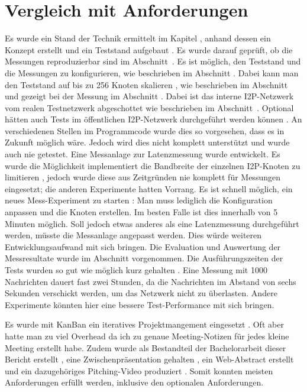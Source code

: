\section{Vergleich mit Anforderungen}\label{sec:vergleich_anforderungen}

Es wurde ein Stand der Technik ermittelt  im Kapitel , anhand dessen ein Konzept  erstellt und ein Teststand aufgebaut .
Es wurde darauf geprüft, ob die Messungen reproduzierbar sind  im Abschnitt~.
Es ist möglich, den Teststand und die Messungen zu konfigurieren, wie beschrieben im Abschnitt  .
Dabei kann man den Teststand auf bis zu 256 Knoten skalieren ,
wie beschrieben im Abschnitt  und gezeigt bei der Messung im Abschnitt .
Dabei ist das interne I2P-Netzwerk vom realen Testnetzwerk abgeschottet  wie beschrieben im Abschnitt~.
Optional hätten auch Tests im öffentlichen I2P-Netzwerk durchgeführt werden können .
An verschiedenen Stellen im Programmcode wurde dies so vorgesehen, dass es in Zukunft möglich wäre.
Jedoch wird dies nicht komplett unterstützt und wurde auch nie getestet.
Eine Messanlage zur Latenzmessung  wurde entwickelt.
Es wurde die Möglichkeit implementiert die Bandbreite der einzelnen I2P-Knoten zu limitieren , jedoch wurde diese aus Zeitgründen nie komplett für Messungen eingesetzt; die anderen Experimente hatten Vorrang.
Es ist schnell möglich, ein neues Mess-Experiment zu starten : Man muss lediglich die Konfiguration anpassen und die Knoten erstellen.
Im besten Falle ist dies innerhalb von 5 Minuten möglich.
Soll jedoch etwas anderes als eine Latenzmessung durchgeführt werden, müsste die Messanlage angepasst werden.
Dies würde weiteren Entwicklungsaufwand mit sich bringen.
Die Evaluation und Auswertung der Messresultate  wurde im Abschnitt  vorgenommen.
Die Ausführungszeiten der Tests wurden so gut wie möglich kurz gehalten . Eine Messung mit 1000 Nachrichten dauert fast zwei Stunden, da die Nachrichten im Abstand von sechs Sekunden verschickt werden, um das Netzwerk nicht zu überlasten. Andere Experimente könnten hier eine bessere Test-Performance mit sich bringen.

Es wurde mit KanBan ein iteratives Projektmangement eingesetzt .
Oft aber hatte man zu viel Overhead da ich zu genaue Meeting-Notizen für jedes kleine Meeting erstellt habe.
Zudem wurde als Bestandteil der Bachelorarbeit dieser Bericht erstellt , eine Zwischenpräsentation gehalten , ein Web-Abstract erstellt  und ein dazugehöriges Pitching-Video produziert .
Somit konnten meisten Anforderungen erfüllt werden, inklusive den optionalen Anforderungen.

